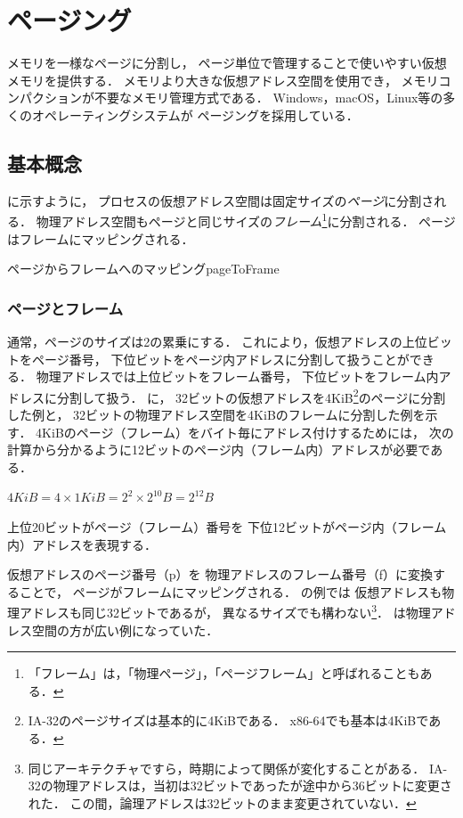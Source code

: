 \chapter{ページング}
% 
メモリを一様なページに分割し，
ページ単位で管理することで使いやすい仮想メモリを提供する．
メモリより大きな仮想アドレス空間を使用でき，
メモリコンパクションが不要なメモリ管理方式である．
Windows，macOS，Linux等の多くのオペレーティングシステムが
ページングを採用している．

\section{基本概念}
に示すように，
プロセスの仮想アドレス空間は固定サイズの\emph{ページ}に分割される．
物理アドレス空間もページと同じサイズの\emph{フレーム}\footnote{
「フレーム」は，「物理ページ」，「ページフレーム」と呼ばれることもある．
}に分割される．
ページはフレームにマッピングされる．

{ページからフレームへのマッピング}{pageToFrame}

\subsection{ページとフレーム}
通常，ページのサイズは2の累乗にする．
これにより，仮想アドレスの上位ビットをページ番号，
下位ビットをページ内アドレスに分割して扱うことができる．
物理アドレスでは上位ビットをフレーム番号，
下位ビットをフレーム内アドレスに分割して扱う．
に，
32ビットの仮想アドレスを4KiB\footnote{
IA-32のページサイズは基本的に4KiBである．
x86-64でも基本は4KiBである．}のページに分割した例と，
32ビットの物理アドレス空間を4KiBのフレームに分割した例を示す．
4KiBのページ（フレーム）をバイト毎にアドレス付けするためには，
次の計算から分かるように12ビットのページ内（フレーム内）アドレスが必要である．
\centerline{$4KiB = 4 \times 1KiB = 2^2 \times 2^{10}B = 2^{12}B$}
上位20ビットがページ（フレーム）番号を
下位12ビットがページ内（フレーム内）アドレスを表現する．

仮想アドレスのページ番号（p）を
物理アドレスのフレーム番号（f）に変換することで，
ページがフレームにマッピングされる．
の例では
仮想アドレスも物理アドレスも同じ32ビットであるが，
異なるサイズでも構わない\footnote{
同じアーキテクチャですら，時期によって関係が変化することがある．
IA-32の物理アドレスは，当初は32ビットであったが途中から36ビットに変更された．
この間，論理アドレスは32ビットのまま変更されていない．}．
は物理アドレス空間の方が広い例になっていた．

